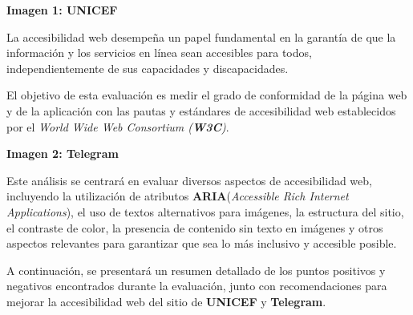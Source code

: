 \documentclass[a4paper]{article}
\newcommand{\imagenUnicef}{unicef.png}
\newcommand{\imagenTelegram}{telegram.jpeg}
\begin{document}
    \begin{center}
        \vspace{0.2cm}\par
        \textbf{Imagen 1: UNICEF\label{fig:imagen-unicef}}
    \end{center}\vspace{0.1cm}

    La accesibilidad web desempeña un papel fundamental en la garantía de que la información y los servicios en línea sean accesibles para todos, independientemente de sus capacidades y discapacidades. \vspace{0.5cm}

    El objetivo de esta evaluación es medir el grado de conformidad de la página web y de la aplicación con las pautas y estándares de accesibilidad web establecidos por el \textit{World Wide Web Consortium (\textbf{W3C})}.\vspace{0.1cm}

    \begin{center}
        \vspace{0.2cm}\par
        \textbf{Imagen 2: Telegram\label{fig:imagen-telegram}}
    \end{center}\vspace{0.1cm}

    Este análisis se centrará en evaluar diversos aspectos de accesibilidad web, incluyendo la utilización de atributos \textbf{ARIA}(\textit{Accessible Rich Internet Applications}), el uso de textos alternativos para imágenes, la estructura del sitio, el contraste de color, la presencia de contenido sin texto en imágenes y otros aspectos relevantes para garantizar que sea lo más inclusivo y accesible posible.\vspace{0.5cm}

    A continuación, se presentará un resumen detallado de los puntos positivos y negativos encontrados durante la evaluación, junto con recomendaciones para mejorar la accesibilidad web del sitio de \textbf{UNICEF} y \textbf{Telegram}.
            
    \newpage

\end{document}
